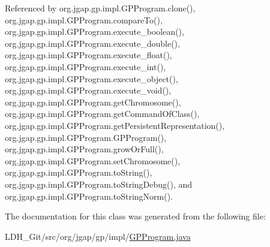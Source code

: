 Referenced by org.\-jgap.\-gp.\-impl.\-G\-P\-Program.\-clone(), org.\-jgap.\-gp.\-impl.\-G\-P\-Program.\-compare\-To(), org.\-jgap.\-gp.\-impl.\-G\-P\-Program.\-execute\-\_\-boolean(), org.\-jgap.\-gp.\-impl.\-G\-P\-Program.\-execute\-\_\-double(), org.\-jgap.\-gp.\-impl.\-G\-P\-Program.\-execute\-\_\-float(), org.\-jgap.\-gp.\-impl.\-G\-P\-Program.\-execute\-\_\-int(), org.\-jgap.\-gp.\-impl.\-G\-P\-Program.\-execute\-\_\-object(), org.\-jgap.\-gp.\-impl.\-G\-P\-Program.\-execute\-\_\-void(), org.\-jgap.\-gp.\-impl.\-G\-P\-Program.\-get\-Chromosome(), org.\-jgap.\-gp.\-impl.\-G\-P\-Program.\-get\-Command\-Of\-Class(), org.\-jgap.\-gp.\-impl.\-G\-P\-Program.\-get\-Persistent\-Representation(), org.\-jgap.\-gp.\-impl.\-G\-P\-Program.\-G\-P\-Program(), org.\-jgap.\-gp.\-impl.\-G\-P\-Program.\-grow\-Or\-Full(), org.\-jgap.\-gp.\-impl.\-G\-P\-Program.\-set\-Chromosome(), org.\-jgap.\-gp.\-impl.\-G\-P\-Program.\-to\-String(), org.\-jgap.\-gp.\-impl.\-G\-P\-Program.\-to\-String\-Debug(), and org.\-jgap.\-gp.\-impl.\-G\-P\-Program.\-to\-String\-Norm().



The documentation for this class was generated from the following file\-:\begin{DoxyCompactItemize}
\item 
L\-D\-H\-\_\-\-Git/src/org/jgap/gp/impl/\hyperlink{_g_p_program_8java}{G\-P\-Program.\-java}\end{DoxyCompactItemize}
